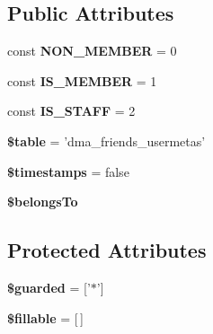 \subsection*{Public Attributes}
\begin{DoxyCompactItemize}
\item 
\hypertarget{classDMA_1_1Friends_1_1Models_1_1Usermeta_a3e0526daabd8785649e0755dbdf4ebae}{const {\bfseries N\+O\+N\+\_\+\+M\+E\+M\+B\+E\+R} = 0}\label{classDMA_1_1Friends_1_1Models_1_1Usermeta_a3e0526daabd8785649e0755dbdf4ebae}

\item 
\hypertarget{classDMA_1_1Friends_1_1Models_1_1Usermeta_aa5a492cddba999d3798f2d0c2340fad5}{const {\bfseries I\+S\+\_\+\+M\+E\+M\+B\+E\+R} = 1}\label{classDMA_1_1Friends_1_1Models_1_1Usermeta_aa5a492cddba999d3798f2d0c2340fad5}

\item 
\hypertarget{classDMA_1_1Friends_1_1Models_1_1Usermeta_a73c2b62b4d8e31f04c362931cf4fad77}{const {\bfseries I\+S\+\_\+\+S\+T\+A\+F\+F} = 2}\label{classDMA_1_1Friends_1_1Models_1_1Usermeta_a73c2b62b4d8e31f04c362931cf4fad77}

\item 
\hypertarget{classDMA_1_1Friends_1_1Models_1_1Usermeta_a7ca76640d4cd53c875648ec87d085f1d}{{\bfseries \$table} = 'dma\+\_\+friends\+\_\+usermetas'}\label{classDMA_1_1Friends_1_1Models_1_1Usermeta_a7ca76640d4cd53c875648ec87d085f1d}

\item 
\hypertarget{classDMA_1_1Friends_1_1Models_1_1Usermeta_ae1136713ee0c7d6696930ebe2401f19c}{{\bfseries \$timestamps} = false}\label{classDMA_1_1Friends_1_1Models_1_1Usermeta_ae1136713ee0c7d6696930ebe2401f19c}

\item 
{\bfseries \$belongs\+To}
\end{DoxyCompactItemize}
\subsection*{Protected Attributes}
\begin{DoxyCompactItemize}
\item 
\hypertarget{classDMA_1_1Friends_1_1Models_1_1Usermeta_a95d74f02cd302db9566b8da29154e82d}{{\bfseries \$guarded} = \mbox{[}'$\ast$'\mbox{]}}\label{classDMA_1_1Friends_1_1Models_1_1Usermeta_a95d74f02cd302db9566b8da29154e82d}

\item 
\hypertarget{classDMA_1_1Friends_1_1Models_1_1Usermeta_a1dca0217848634cab6e2ad205804e351}{{\bfseries \$fillable} = \mbox{[}$\,$\mbox{]}}\label{classDMA_1_1Friends_1_1Models_1_1Usermeta_a1dca0217848634cab6e2ad205804e351}

\end{DoxyCompactItemize}



